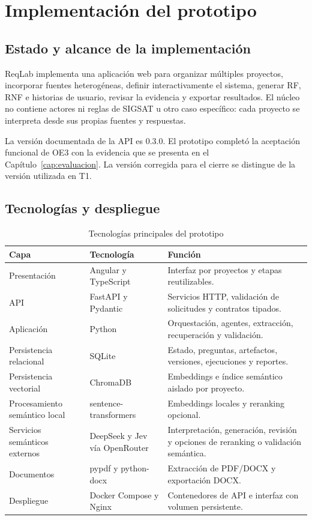 \chapter{Implementación del prototipo}
\label{cap:implementacion}

\section{Estado y alcance de la implementación}

ReqLab implementa una aplicación web para organizar múltiples proyectos, incorporar fuentes heterogéneas, definir interactivamente el sistema, generar RF, RNF e historias de usuario, revisar la evidencia y exportar resultados. El núcleo no contiene actores ni reglas de SIGSAT u otro caso específico: cada proyecto se interpreta desde sus propias fuentes y respuestas.

La versión documentada de la API es 0.3.0. El prototipo completó la aceptación funcional de OE3 con la evidencia que se presenta en el Capítulo~\ref{cap:evaluacion}. La versión corregida para el cierre se distingue de la versión utilizada en T1.

\section{Tecnologías y despliegue}

\begin{table}[H]
  \centering
  \caption{Tecnologías principales del prototipo}
  \label{tab:tecnologias-prototipo}
  \small
  \begin{tabularx}{\textwidth}{p{3.5cm}p{4.0cm}Y}
    \toprule
    Capa & Tecnología & Función \\
    \midrule
    Presentación & Angular y TypeScript & Interfaz por proyectos y etapas reutilizables. \\
    API & FastAPI y Pydantic & Servicios HTTP, validación de solicitudes y contratos tipados. \\
    Aplicación & Python & Orquestación, agentes, extracción, recuperación y validación. \\
    Persistencia relacional & SQLite & Estado, preguntas, artefactos, versiones, ejecuciones y reportes. \\
    Persistencia vectorial & ChromaDB & Embeddings e índice semántico aislado por proyecto. \\
    Procesamiento semántico local & sentence-transformers & Embeddings locales y reranking opcional. \\
    Servicios semánticos externos & DeepSeek y Jev vía OpenRouter & Interpretación, generación, revisión y opciones de reranking o validación semántica. \\
    Documentos & pypdf y python-docx & Extracción de PDF/DOCX y exportación DOCX. \\
    Despliegue & Docker Compose y Nginx & Contenedores de API e interfaz con volumen persistente. \\
    \bottomrule
  \end{tabularx}
\end{table}

